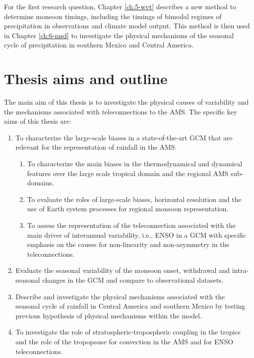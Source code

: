  For the first research question, Chapter \ref{ch:5-wvt} describes a new method to determine monsoon timings, including the timings of bimodal regimes of precipitation in observations and climate model output. This method is then used in Chapter \ref{ch:6-msd} to investigate the physical mechanisms of the seasonal cycle of precipitation in southern Mexico and Central America.
 
\section{Thesis aims and outline}
The main aim of this thesis is to investigate the physical causes of variability and the mechanisms associated with teleconnections to the AMS. The specific key aims of this thesis are: 

\begin{enumerate}
\item To characterize the large-scale biases in a state-of-the-art GCM that are relevant for the representation of rainfall in the AMS.  
\begin{enumerate}
\item To characterize the main biases in the thermodynamical and dynamical features over the large scale tropical domain and the regional AMS sub-domains.
\item To evaluate the roles of large-scale biases, horizontal resolution and the use of Earth system processes for regional monsoon representation.
\item To assess the representation of the teleconnection associated with the main driver of interannual variability, i.e., ENSO in a GCM with specific emphasis on the causes for non-linearity and non-asymmetry in the teleconnections.
\end{enumerate}
\item Evaluate the seasonal variability of the monsoon onset, withdrawal and intra-seasonal changes in the GCM and compare to observational datasets. 
\item Describe and investigate the physical mechanisms associated with the seasonal cycle of rainfall in Central America and southern Mexico by testing previous hypothesis of physical mechanisms within the model.
\item To investigate the role of stratospheric-tropospheric coupling in the tropics and the role of the tropopause for convection in the AMS and for ENSO teleconnections.
\end{enumerate}

